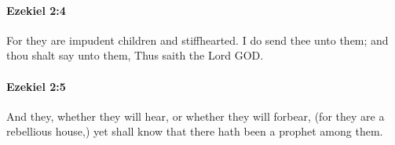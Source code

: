 		\paragraph{Ezekiel 2:4} %
			\label{EZEKIEL-2-4}

			For they are impudent children and stiffhearted. I do send thee unto them; and thou shalt say unto them, Thus saith the Lord GOD.


		\paragraph{Ezekiel 2:5} %
			\label{EZEKIEL-2-5}

			And they, whether they will hear, or whether they will forbear, (for they are a rebellious house,) yet shall know that there hath been a prophet among them.



